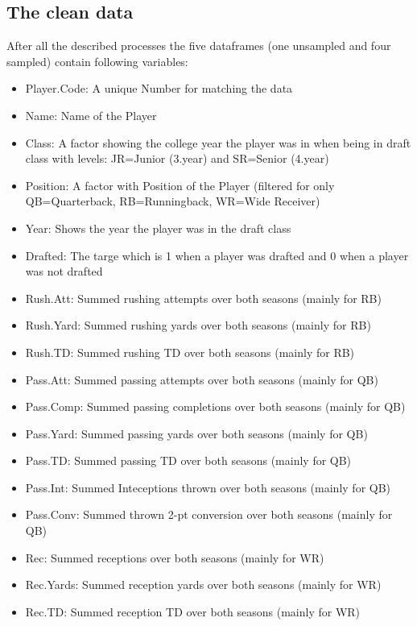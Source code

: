 \documentclass[]{article}
\providecommand{\tightlist}{%
  \setlength{\itemsep}{0pt}\setlength{\parskip}{0pt}}
\begin{document}
\hypertarget{the-clean-data}{%
\subsection{The clean data}\label{the-clean-data}}

After all the described processes the five dataframes (one unsampled and
four sampled) contain following variables:

\begin{itemize}
\tightlist
\item
  Player.Code: A unique Number for matching the data
\item
  Name: Name of the Player
\item
  Class: A factor showing the college year the player was in when being
  in draft class with levels: JR=Junior (3.year) and SR=Senior (4.year)
\item
  Position: A factor with Position of the Player (filtered for only
  QB=Quarterback, RB=Runningback, WR=Wide Receiver)
\item
  Year: Shows the year the player was in the draft class
\item
  Drafted: The targe which is 1 when a player was drafted and 0 when a
  player was not drafted
\item
  Rush.Att: Summed rushing attempts over both seasons (mainly for RB)
\item
  Rush.Yard: Summed rushing yards over both seasons (mainly for RB)
\item
  Rush.TD: Summed rushing TD over both seasons (mainly for RB)
\item
  Pass.Att: Summed passing attempts over both seasons (mainly for QB)
\item
  Pass.Comp: Summed passing completions over both seasons (mainly for
  QB)
\item
  Pass.Yard: Summed passing yards over both seasons (mainly for QB)
\item
  Pass.TD: Summed passing TD over both seasons (mainly for QB)
\item
  Pass.Int: Summed Inteceptions thrown over both seasons (mainly for QB)
\item
  Pass.Conv: Summed thrown 2-pt conversion over both seasons (mainly for
  QB)
\item
  Rec: Summed receptions over both seasons (mainly for WR)
\item
  Rec.Yards: Summed reception yards over both seasons (mainly for WR)
\item
  Rec.TD: Summed reception TD over both seasons (mainly for WR)

\end{itemize}
\end{document}
